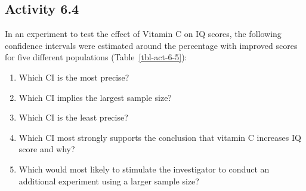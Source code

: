 \documentclass[
  a4paper,
]{memoir}
\providecommand{\tightlist}{%
  \setlength{\itemsep}{0pt}\setlength{\parskip}{0pt}}
\begin{document}
\subsection*{Activity 6.4}\label{activity-6.4}

In an experiment to test the effect of Vitamin C on IQ scores, the
following confidence intervals were estimated around the percentage with
improved scores for five different populations
(Table~\ref{tbl-act-6-5}):

\begin{table}[h]

\caption{\label{tbl-act-6-5}Study results from five difference
populations}


\end{table}%

\begin{enumerate}
\def\labelenumi{\alph{enumi})}
\tightlist
\item
  Which CI is the most precise?
\item
  Which CI implies the largest sample size?
\item
  Which CI is the least precise?
\item
  Which CI most strongly supports the conclusion that vitamin C
  increases IQ score and why?
\item
  Which would most likely to stimulate the investigator to conduct an
  additional experiment using a larger sample size?
\end{enumerate}
\end{document}
